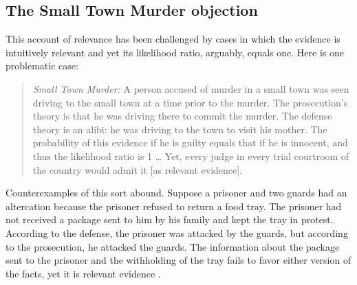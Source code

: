 \documentclass{article}
\begin{document}
\subsection{The Small Town Murder objection}

This account of relevance has been challenged by cases in which the evidence 
is intuitively relevant and yet
its likelihood ratio, arguably, equals one. Here is one problematic case:
\begin{quote}
	\emph{Small Town Murder:} A person accused of murder in a small town was seen driving to the small town at a time prior to the murder. The prosecution's theory is that he was driving there to commit the murder. The defense theory is an alibi: he was driving to the town to visit his mother. The probability of this evidence if he is guilty equals that if he is innocent, and thus the likelihood ratio is 1 \dots %
	Yet, every judge in every trial courtroom of the country would admit it [as relevant evidence]. %
	\citep[The difficulty has been formulated by Ronald Allen, see the discussion in][]{park2010BayesWarsRedivivus}
	\end{quote}
\noindent 
Counterexamples of this sort abound. Suppose a prisoner and two guards had an altercation because the prisoner refused to return a food tray.  The prisoner had not received a package sent to him by his family and kept the tray in protest. According to the defense, the prisoner was attacked by the guards, but according to the prosecution, he attacked the guards. The information about the package sent to the prisoner and the withholding of the tray fails to favor either version of the facts, yet it is relevant evidence \citep{pardo2013NaturePurposeEvidence}.
\end{document}
